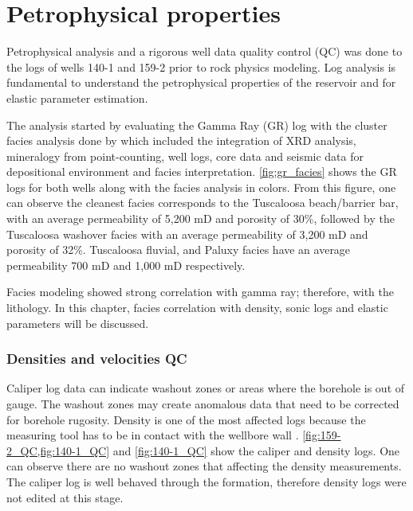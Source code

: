 \chapter{Petrophysical properties}


Petrophysical analysis and a rigorous well data quality control (QC)
was done to the logs of wells 140-1 and 159-2 prior to rock physics modeling.
Log analysis is fundamental to understand the petrophysical
properties of the reservoir and for elastic 
parameter estimation.

The analysis started by evaluating the Gamma Ray (GR) log with the cluster
facies analysis done by \cite{ref:doug} which included the integration 
of XRD analysis, mineralogy from point-counting, well logs, core data and seismic data
for depositional environment and facies interpretation. \ref{fig:gr_facies} shows
the GR logs for both wells along with the facies analysis in colors. From this figure, one can 
observe the cleanest facies corresponds to the Tuscaloosa beach/barrier bar, with an
average permeability of 5,200 mD and porosity of 30\%, followed by the Tuscaloosa washover
facies with an average permeability of 3,200 mD and porosity of 32\%. Tuscaloosa fluvial,
and Paluxy facies have an average permeability 700 mD and 1,000 mD respectively. 

Facies modeling showed strong correlation with gamma ray;
therefore, with the lithology. In this chapter, facies
correlation with density, sonic logs and elastic parameters
will be discussed.  


 

\subsection{Densities and velocities QC}

Caliper log data can indicate washout zones or areas where the borehole is out
of gauge. The washout zones may create
anomalous data that need to be corrected for borehole rugosity. Density is one
 of the most affected logs because the measuring tool has to be in contact with 
the wellbore wall \citep{ref:tad}. 
\ref{fig:159-2_QC,fig:140-1_QC} and \ref{fig:140-1_QC} show the caliper and density logs. One can observe there are no washout zones that affecting the density measurements. 
The caliper log is well behaved through the formation, therefore density logs were
 not edited at this stage.


